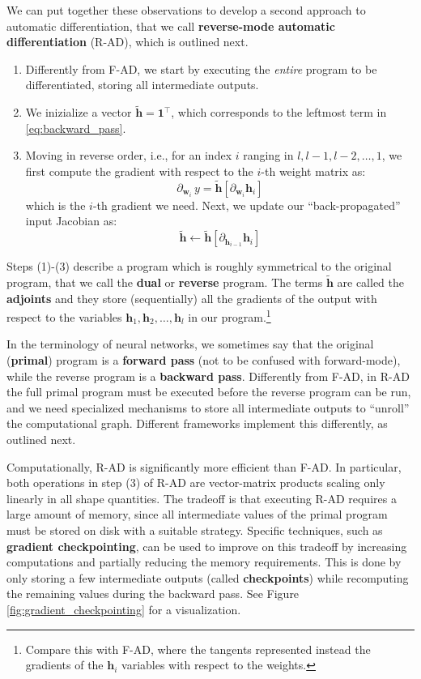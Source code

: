 We can put together these observations to develop a second approach to automatic differentiation, that we call \textbf{reverse-mode automatic differentiation} (R-AD), which is outlined next.

\begin{enumerate}
\item Differently from F-AD, we start by executing the \textit{entire} program to be differentiated, storing all intermediate outputs.
\item We inizialize a vector $\widetilde{\mathbf{h}} =\mathbf{1}^\top$, which corresponds to the leftmost term in \eqref{eq:backward_pass}.
\item Moving in reverse order, i.e., for an index $i$ ranging in $l, l-1, l-2,\ldots, 1$, we first compute the gradient with respect to the $i$-th weight matrix as:
%
$$
\partial_{\mathbf{w}_i}\, y  = \widetilde{\mathbf{h}} \left[\partial_{\mathbf{w}_i} \mathbf{h}_{i}\right]
$$
%
which is the $i$-th gradient we need. Next, we update our “back-propagated” input Jacobian as:
%
$$
\widetilde{\mathbf{h}} \leftarrow \widetilde{\mathbf{h}} \left[\partial_{\mathbf{h}_{i-1}}\mathbf{h}_{i}\right]
$$
\end{enumerate}

Steps (1)-(3) describe a program which is roughly symmetrical to the original program, that we call the \textbf{dual} or \textbf{reverse} program. The terms $\widetilde{\mathbf{h}}$ are called the \textbf{adjoints} and they store (sequentially) all the gradients of the output with respect to the variables $\mathbf{h}_1, \mathbf{h}_2, \ldots, \mathbf{h}_{l}$ in our program.\footnote{Compare this with F-AD, where the tangents represented instead the gradients of the $\mathbf{h}_i$ variables with respect to the weights.}

In the terminology of neural networks, we sometimes say that the original (\textbf{primal}) program is a \textbf{forward pass} (not to be confused with forward-mode), while the reverse program is a \textbf{backward pass}. Differently from F-AD, in R-AD the full primal program must be executed before the reverse program can be run, and we need specialized mechanisms to store all intermediate outputs to “unroll” the computational graph. Different frameworks implement this differently, as outlined next.

Computationally, R-AD is significantly more efficient than F-AD. In particular, both operations in step (3) of R-AD are vector-matrix products scaling only linearly in all shape quantities. The tradeoff is that executing R-AD requires a large amount of memory, since all intermediate values of the primal program must be stored on disk with a suitable strategy. Specific techniques, such as \textbf{gradient checkpointing}, can be used to improve on this tradeoff by increasing computations and partially reducing the memory requirements. This is done by only storing a few intermediate outputs (called \textbf{checkpoints}) while recomputing the remaining values during the backward pass. See Figure \ref{fig:gradient_checkpointing} for a visualization.

